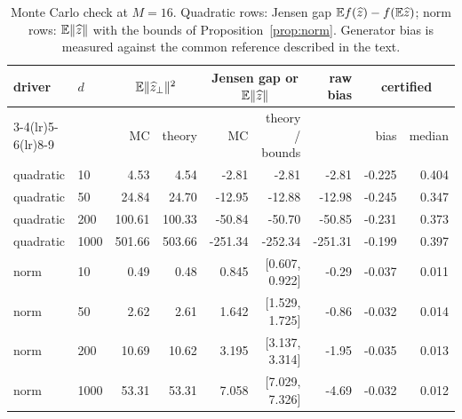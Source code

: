 \begin{table}[h]\centering\small
\caption{Monte Carlo check at $M=16$. Quadratic rows: Jensen gap $\mathbb E f(\widehat z)-f(\mathbb E\widehat z)$; norm rows: $\mathbb E\lVert\widehat z\rVert$ with the bounds of Proposition~\ref{prop:norm}. Generator bias is measured against the common reference described in the text.}
\label{tab:check}
\begin{tabular}{@{}llrrrrrrr@{}}\toprule
driver & $d$ & \multicolumn{2}{c}{$\mathbb E\lVert\widehat z_\perp\rVert^2$} & \multicolumn{2}{c}{Jensen gap or $\mathbb E\lVert\widehat z\rVert$} & raw bias & \multicolumn{2}{c}{certified}\\
\cmidrule(lr){3-4}\cmidrule(lr){5-6}\cmidrule(lr){8-9}
 & & MC & theory & MC & theory / bounds & & bias & median\\\midrule
quadratic & 10 & 4.53 & 4.54 & -2.81 & -2.81 & -2.81 & -0.225 & 0.404\\
quadratic & 50 & 24.84 & 24.70 & -12.95 & -12.88 & -12.98 & -0.245 & 0.347\\
quadratic & 200 & 100.61 & 100.33 & -50.84 & -50.70 & -50.85 & -0.231 & 0.373\\
quadratic & 1000 & 501.66 & 503.66 & -251.34 & -252.34 & -251.31 & -0.199 & 0.397\\
norm & 10 & 0.49 & 0.48 & 0.845 & [0.607, 0.922] & -0.29 & -0.037 & 0.011\\
norm & 50 & 2.62 & 2.61 & 1.642 & [1.529, 1.725] & -0.86 & -0.032 & 0.014\\
norm & 200 & 10.69 & 10.62 & 3.195 & [3.137, 3.314] & -1.95 & -0.035 & 0.013\\
norm & 1000 & 53.31 & 53.31 & 7.058 & [7.029, 7.326] & -4.69 & -0.032 & 0.012\\
\bottomrule\end{tabular}\end{table}
